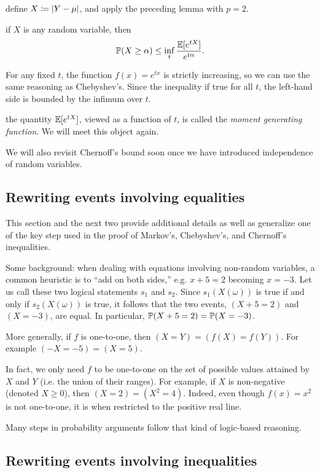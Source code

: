 \documentclass{article}
\begin{document}
 define $X \defeq |Y - \mu|$, and apply the preceding lemma with $p = 2$.

 if $X$ is any random variable, then
\[ \P(X \ge \alpha) \le \inf_t \frac{\E[e^{tX}]}{e^{t\alpha}}. \]

 For any fixed $t$, the function $f(x) = e^{tx}$ is strictly increasing, so we can use the same reasoning as Chebyshev's. Since the inequality if true for all $t$, the left-hand side is bounded by the infimum over $t$.

 the quantity $\E[e^{tX}]$, viewed as a function of $t$, is called the \emph{moment generating function}. We will meet this object again. 

We will also revisit Chernoff's bound soon once we have introduced independence of random variables. 


\subsection{Rewriting events involving equalities}\label{sec:rewriting-equalities}

This section and the next two provide additional details as well as generalize one of the key step used in the proof of Markov's, Chebyshev's, and Chernoff's inequalities.

Some background: when dealing with equations involving non-random variables, a common heuristic is to ``add on both sides,'' e.g. $x + 5 = 2$ becoming $x = -3$. Let us call these two logical statements $s_1$ and $s_2$. Since $s_1(X(\omega))$ is true if and only if  $s_2(X(\omega))$ is true, it follows that the two events, $(X + 5 = 2)$ and $(X = -3)$, are equal. In particular, $\P(X + 5 = 2) = \P(X = -3)$.

More generally, if $f$ is one-to-one, then $(X = Y) = (f(X) = f(Y))$. For example $(-X = -5) = (X = 5)$. 

In fact, we only need $f$ to be one-to-one on the set of possible values attained by $X$ and $Y$ (i.e. the union of their ranges). For example, if $X$ is non-negative (denoted $X \ge 0$), then $(X = 2) = (X^2 = 4)$. Indeed, even though $f(x) = x^2$ is not one-to-one, it is when restricted to the positive real line.

Many steps in probability arguments follow that kind of logic-based reasoning.


\subsection{Rewriting events involving inequalities}\label{sec:rewriting-inequalities}
\end{document}
